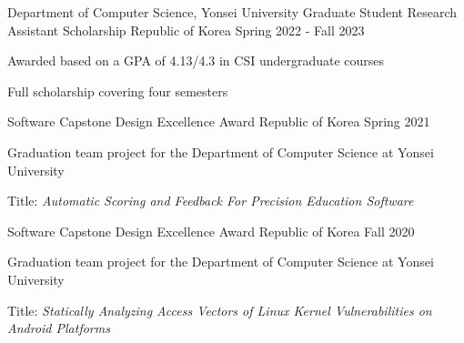 

\begin{cventries}

  \cventry
    {Department of Computer Science, Yonsei University} %
    {Graduate Student Research Assistant Scholarship} %
    {Republic of Korea} %
    {Spring 2022 - Fall 2023} %
    {
      \begin{cvitems} %
        \item {Awarded based on a GPA of 4.13/4.3 in CSI undergraduate courses}
        \item {Full scholarship covering four semesters}
      \end{cvitems}
    }

  \cventry
    {Software Capstone Design} %
    {Excellence Award} %
    {Republic of Korea} %
    {Spring 2021} %
    {
      \begin{cvitems}
        \item {Graduation team project for the Department of Computer Science at Yonsei University}
        \item {Title: \textit{Automatic Scoring and Feedback For Precision Education Software}}
      \end{cvitems}
    }

  \cventry
    {Software Capstone Design} %
    {Excellence Award} %
    {Republic of Korea} %
    {Fall 2020} %
    {
      \begin{cvitems}
        \item {Graduation team project for the Department of Computer Science at Yonsei University}
        \item {Title: \textit{Statically Analyzing Access Vectors of Linux Kernel Vulnerabilities on Android Platforms}}
      \end{cvitems}
    }

\end{cventries}
